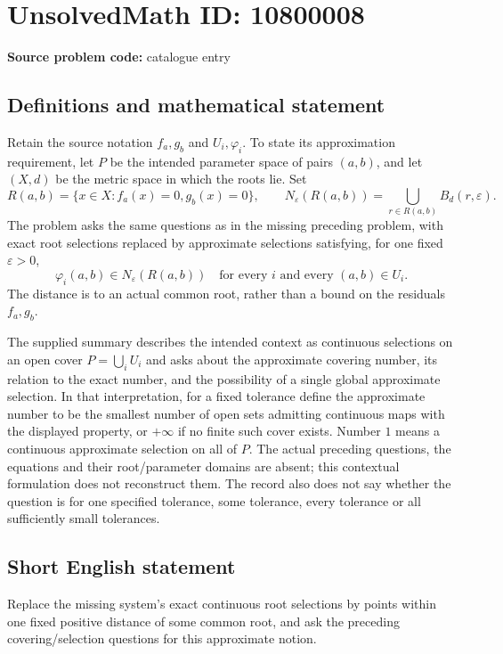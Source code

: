 \documentclass[11pt]{article}
\begin{document}
\section*{UnsolvedMath ID: 10800008}
\textbf{Source problem code:} catalogue entry
\subsection{Definitions and mathematical statement}
Retain the source notation \(f_a,g_b\) and \(U_i,\varphi_i\). To state its approximation requirement, let \(P\) be the intended parameter space of pairs \((a,b)\), and let \((X,d)\) be the metric space in which the roots lie. Set
\[
 R(a,b)=\{x\in X:f_a(x)=0, g_b(x)=0\},\qquad
 N_\varepsilon(R(a,b))=\bigcup_{r\in R(a,b)}B_d(r,\varepsilon).
\]
The problem asks the same questions as in the missing preceding problem, with exact root selections replaced by approximate selections satisfying, for one fixed \(\varepsilon>0\),
\[
 \varphi_i(a,b)\in N_\varepsilon(R(a,b))
 \quad\text{for every }i\text{ and every }(a,b)\in U_i.
\]
The distance is to an actual common root, rather than a bound on the residuals \(f_a,g_b\).

The supplied summary describes the intended context as continuous selections on an open cover \(P=\bigcup_iU_i\) and asks about the approximate covering number, its relation to the exact number, and the possibility of a single global approximate selection. In that interpretation, for a fixed tolerance define the approximate number to be the smallest number of open sets admitting continuous maps with the displayed property, or \(+\infty\) if no finite such cover exists. Number \(1\) means a continuous approximate selection on all of \(P\). The actual preceding questions, the equations and their root/parameter domains are absent; this contextual formulation does not reconstruct them. The record also does not say whether the question is for one specified tolerance, some tolerance, every tolerance or all sufficiently small tolerances.
\subsection{Short English statement}
Replace the missing system's exact continuous root selections by points within one fixed positive distance of some common root, and ask the preceding covering/selection questions for this approximate notion.
\end{document}
